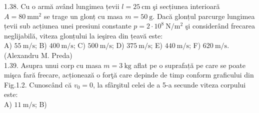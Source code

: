 \documentclass[10pt]{article}
\begin{document}
1.38. Cu o armă având lungimea țevii $l=25 \mathrm{~cm}$ şi secțiunea interioară $A=80 \mathrm{~mm}^{2}$ se trage un glonț cu masa $m=50 \mathrm{~g}$. Dacă glonțul parcurge lungimea țevii sub acțiunea unei presiuni constante $p=2 \cdot 10^{8} \mathrm{~N} / \mathrm{m}^{2}$ şi considerând frecarea neglijabilă, viteza glonțului la ieşirea din țeavă este:\\ A) $55 \mathrm{~m} / \mathrm{s}$; B) $400 \mathrm{~m} / \mathrm{s}$; C) $500 \mathrm{~m} / \mathrm{s}$; D) $375 \mathrm{~m} / \mathrm{s}$; E) $440 \mathrm{~m} / \mathrm{s}$; F) $620 \mathrm{~m} / \mathrm{s}$.\\ (Alexandru M. Preda)\\

1.39. Asupra unui corp cu masa $m=3 \mathrm{~kg}$ aflat pe o suprafață pe care se poate mişca fară frecare, acționează o forţă care depinde de timp conform graficului din Fig.1.2. Cunoscând că $v_{0}=0$, la sfârşitul celei de a 5-a secunde viteza corpului este:\\ A) $11 \mathrm{~m} / \mathrm{s}$; B) 
\end{document}
